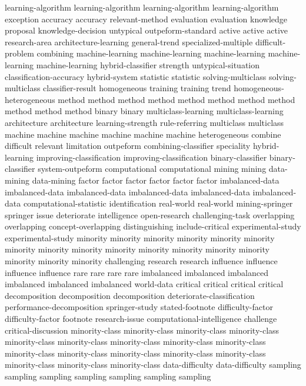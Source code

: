 learning-algorithm	learning-algorithm	learning-algorithm	learning-algorithm	
exception	
accuracy	accuracy	
relevant-method	
evaluation	evaluation	
knowledge	
proposal	
knowledge-decision	
untypical	
outpeform-standard	
active	active	active	
research-area	
architecture-learning	
general-trend	
specialized-multiple	
difficult-problem	
combining	
machine-learning	machine-learning	machine-learning	machine-learning	machine-learning	
hybrid-classifier	
strength	
untypical-situation	
classification-accuracy	
hybrid-system	
statistic	statistic	
solving-multiclass	solving-multiclass	
classifier-result	
homogeneous	
training	training	
trend	
homogeneous-heterogeneous	
method	method	method	method	method	method	method	method	method	method	method	
binary	binary	
multiclass-learning	multiclass-learning	
architecture	architecture	
learning-strength	
rule-referring	
multiclass	multiclass	
machine	machine	machine	machine	machine	machine	
heterogeneous	
combine	
difficult	
relevant	
limitation	
outpeform	
combining-classifier	
speciality	
hybrid-learning	
improving-classification	improving-classification	
binary-classifier	binary-classifier	
system-outpeform	
computational	computational	
mining	mining	
data-mining	data-mining	
factor	factor	factor	factor	factor	factor	
imbalanced-data	imbalanced-data	imbalanced-data	imbalanced-data	imbalanced-data	imbalanced-data	
computational-statistic	
identification	
real-world	real-world	
mining-springer	
springer	
issue	
deteriorate	
intelligence	
open-research	
challenging-task	
overlapping	overlapping	
concept-overlapping	
distinguishing	
include-critical	
experimental-study	experimental-study	
minority	minority	minority	minority	minority	minority	minority	minority	minority	minority	minority	minority	minority	minority	minority	minority	minority	
challenging	
research	research	
influence	influence	influence	influence	
rare	rare	rare	rare	
imbalanced	imbalanced	imbalanced	imbalanced	imbalanced	imbalanced	
world-data	
critical	critical	critical	critical	
decomposition	decomposition	decomposition	
deteriorate-classification	
performance-decomposition	
springer-study	
stated-footnote	
difficulty-factor	difficulty-factor	
footnote	
research-issue	
computational-intelligence	
challenge	
critical-discussion	
minority-class	minority-class	minority-class	minority-class	minority-class	minority-class	minority-class	minority-class	minority-class	minority-class	minority-class	minority-class	minority-class	minority-class	minority-class	minority-class	minority-class	
data-difficulty	data-difficulty	
sampling	sampling	sampling	sampling	sampling	sampling	sampling	
